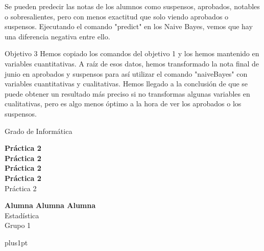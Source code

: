 \documentclass[12pt,a4paper,titlepage,twopages]{article}
\begin{document}
Se pueden predecir las notas de los alumnos como suspensos, aprobados, notables o sobresalientes, pero con menos exactitud que solo viendo aprobados o suspensos. Ejecutando el comando "predict" en los Naive Bayes, vemos que hay una diferencia negativa entre ello.

Objetivo 3
Hemos copiado los comandos del objetivo 1 y los hemos mantenido en variables cuantitativas. A raíz de esos datos, hemos transformado la nota final de junio en aprobados y suspensos para así utilizar el comando "naiveBayes" con variables cuantitativas y cualitativas. Hemos llegado a la conclusión de que se puede obtener un resultado más preciso si no transformas algunas variables en cualitativas, pero es algo menos óptimo a la hora de ver los aprobados o los suspensos. 
\thispagestyle{empty}

\begin{center}
\Large{Grado de Informática} \\
\bigskip

\begin{figure}[!h]
\begin{center}
\end{center}
\end{figure}

\vspace{40mm}

\textbf{\Large{Práctica 2}} \\
\bigskip
\bigskip
\textbf{\Huge{Práctica 2}} \\
\bigskip
\textbf{\Huge{Práctica 2}} \\
\bigskip
\LARGE{\textbf{Práctica 2}} \\
\Large{Práctica 2} \\

\vspace{\fill}

\textbf{\Large{Alumna Alumna Alumna}} \\
\bigskip
\Large{Estadística \\ Grupo 1}

\bigskip
\bigskip
\bigskip
\bigskip

\end{center}



 \renewcommand\baselinestretch{1.2}
\baselineskip=18pt plus1pt

\newpage
\tableofcontents
\end{document}
